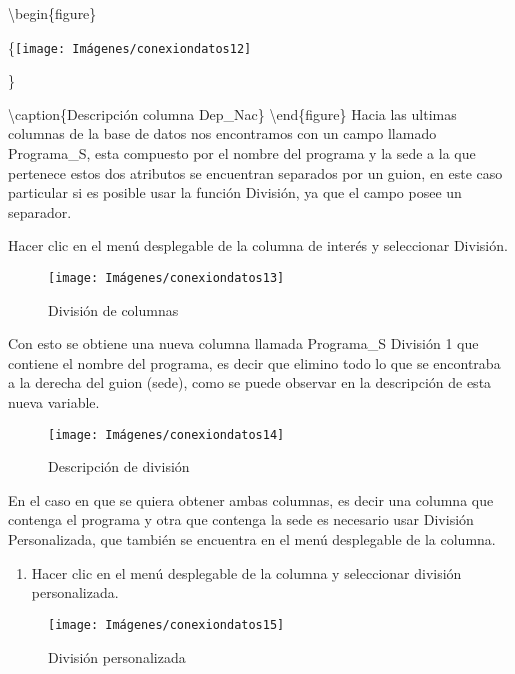\documentclass[
]{book}
\providecommand{\tightlist}{%
  \setlength{\itemsep}{0pt}\setlength{\parskip}{0pt}}
\begin{document}
\textbackslash begin\{figure\}

\{\centering \texttt{[image: Imágenes/conexiondatos12]}

\}

\textbackslash caption\{Descripción columna Dep\_Nac\}\label{fig:descripcion-fig}
\textbackslash end\{figure\}
Hacia las ultimas columnas de la base de datos nos encontramos con un campo llamado Programa\_S, esta compuesto por el nombre del programa y la sede a la que pertenece estos dos atributos se encuentran separados por un guion, en este caso particular si es posible usar la función División, ya que el campo posee un separador.

Hacer clic en el menú desplegable de la columna de interés y seleccionar División.

\begin{figure}

{\centering \texttt{[image: Imágenes/conexiondatos13]} 

}

\caption{División de columnas}\label{fig:división-fig}
\end{figure}

Con esto se obtiene una nueva columna llamada Programa\_S División 1 que contiene el nombre del programa, es decir que elimino todo lo que se encontraba a la derecha del guion (sede), como se puede observar en la descripción de esta nueva variable.

\begin{figure}

{\centering \texttt{[image: Imágenes/conexiondatos14]} 

}

\caption{Descripción de división}\label{fig:divisióndescripcion-fig}
\end{figure}

En el caso en que se quiera obtener ambas columnas, es decir una columna que contenga el programa y otra que contenga la sede es necesario usar División Personalizada, que también se encuentra en el menú desplegable de la columna.

\begin{enumerate}
\def\labelenumi{\arabic{enumi}.}
\tightlist
\item
  Hacer clic en el menú desplegable de la columna y seleccionar división personalizada.
\end{enumerate}

\begin{figure}

{\centering \texttt{[image: Imágenes/conexiondatos15]} 

}

\caption{División personalizada}\label{fig:divisiónpersonalizada-fig}
\end{figure}
\end{document}
